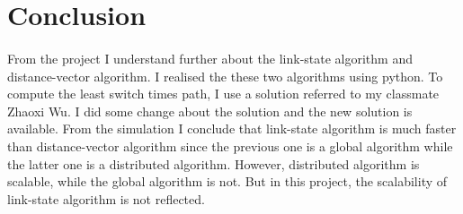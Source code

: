 \documentclass[12pt]{article}
\begin{document}

\section{Conclusion}
\paragraph{}
From the project I understand further about the link-state algorithm and 
distance-vector algorithm. I realised the these two algorithms using python. To compute the least switch times path, I use a solution referred to my classmate Zhaoxi Wu. I did some change about the solution and the new solution is available. From the simulation I conclude that link-state algorithm is much faster than distance-vector algorithm since the previous one is a global algorithm while the latter one is a distributed algorithm. However, distributed algorithm is scalable, while the global algorithm is not. But in this project, the scalability of link-state algorithm is not reflected. 
\end{document}
